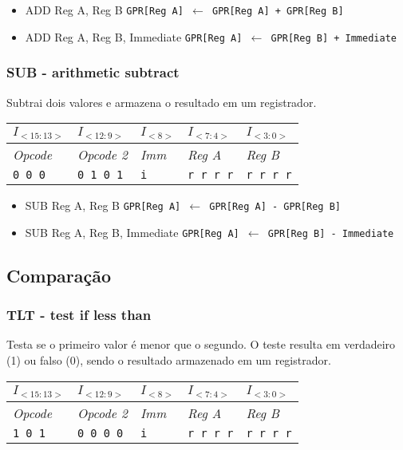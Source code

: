 \documentclass[11pt,a4paper]{report}
\begin{document}
\begin{itemize}
\item ADD Reg A, Reg B
\subitem \texttt{GPR[Reg A] $\leftarrow$ GPR[Reg A] + GPR[Reg B]}
\item ADD Reg A, Reg B, Immediate
\subitem \texttt{GPR[Reg A] $\leftarrow$ GPR[Reg B] + Immediate}
\end{itemize}

\subsubsection{SUB - arithmetic subtract}
Subtrai dois valores e armazena o resultado em um registrador.

\begin{table}[htb!]
\centering
\begin{tabular}{|p{2cm}|p{2cm}|p{2cm}|p{2cm}|p{2cm}|}
\hline
$I_{<15:13>}$ & $I_{<12:9>}$ & $I_{<8>}$ & $I_{<7:4>}$ & $I_{<3:0>}$  \\ \hline
\textit{Opcode} & \textit{Opcode 2} & \textit{Imm} & \textit{Reg A} & \textit{Reg B} \\ \hline
\texttt{0 0 0} & \texttt{0 1 0 1} & \texttt{i} & \texttt{r r r r} & \texttt{r r r r} \\ \hline
\end{tabular}
\end{table}

\begin{itemize}
\item SUB Reg A, Reg B
\subitem \texttt{GPR[Reg A] $\leftarrow$ GPR[Reg A] - GPR[Reg B]}
\item SUB Reg A, Reg B, Immediate
\subitem \texttt{GPR[Reg A] $\leftarrow$ GPR[Reg B] - Immediate}
\end{itemize}


\subsection{Comparação}

\subsubsection{TLT - test if less than}
Testa se o primeiro valor é menor que o segundo. O teste resulta em
verdadeiro (1) ou falso (0), sendo o resultado armazenado em um
registrador.

\begin{table}[htb!]
\centering
\begin{tabular}{|p{2cm}|p{2cm}|p{2cm}|p{2cm}|p{2cm}|}
\hline
$I_{<15:13>}$ & $I_{<12:9>}$ & $I_{<8>}$ & $I_{<7:4>}$ & $I_{<3:0>}$  \\ \hline
\textit{Opcode} & \textit{Opcode 2} & \textit{Imm} & \textit{Reg A} & \textit{Reg B} \\ \hline
\texttt{1 0 1} & \texttt{0 0 0 0} & \texttt{i} & \texttt{r r r r} & \texttt{r r r r} \\ \hline
\end{tabular}
\end{table}
\end{document}
